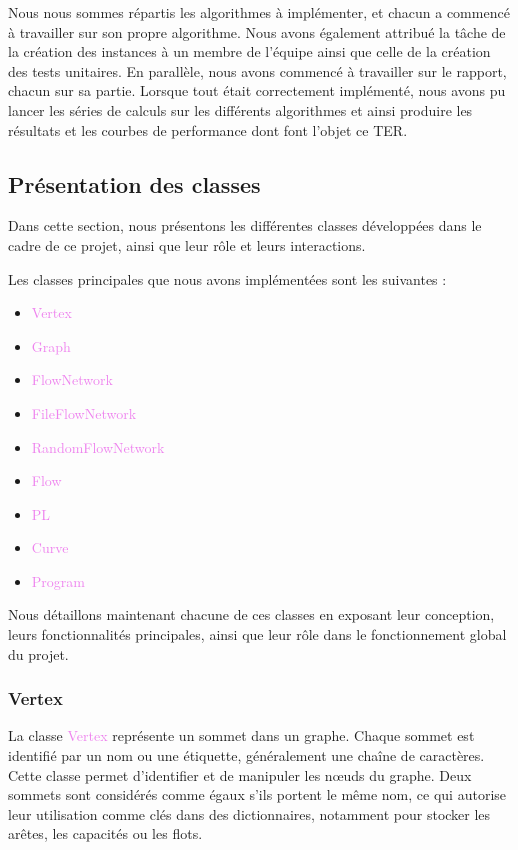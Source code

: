 \documentclass[a4paper]{article}
\begin{document}
Nous nous sommes répartis les algorithmes à implémenter, et chacun a commencé à travailler sur son propre algorithme. Nous avons également attribué la tâche de la création des instances à un membre de l'équipe ainsi que celle de la création des tests unitaires. En parallèle, nous avons commencé à travailler sur le rapport, chacun sur sa partie. Lorsque tout était correctement implémenté, nous avons pu lancer les séries de calculs sur les différents algorithmes et ainsi produire les résultats et les courbes de performance dont font l'objet ce TER.
\subsection{Présentation des classes}

Dans cette section, nous présentons les différentes classes développées dans le cadre de ce projet, ainsi que leur rôle et leurs interactions.

Les classes principales que nous avons implémentées sont les suivantes :

\begin{itemize}
    \item \textcolor{violet}{Vertex}
    \item \textcolor{violet}{Graph}
    \item \textcolor{violet}{FlowNetwork}
    \item \textcolor{violet}{FileFlowNetwork}
    \item \textcolor{violet}{RandomFlowNetwork}
    \item \textcolor{violet}{Flow}
    \item \textcolor{violet}{PL}
    \item \textcolor{violet}{Curve}
    \item \textcolor{violet}{Program}
\end{itemize}

Nous détaillons maintenant chacune de ces classes en exposant leur conception, leurs fonctionnalités principales, ainsi que leur rôle dans le fonctionnement global du projet.

\subsubsection{Vertex}

La classe \textcolor{violet}{Vertex} représente un sommet dans un graphe. Chaque sommet est identifié par un nom ou une étiquette, généralement une chaîne de caractères. Cette classe permet d'identifier et de manipuler les nœuds du graphe. Deux sommets sont considérés comme égaux s'ils portent le même nom, ce qui autorise leur utilisation comme clés dans des dictionnaires, notamment pour stocker les arêtes, les capacités ou les flots.
\end{document}
